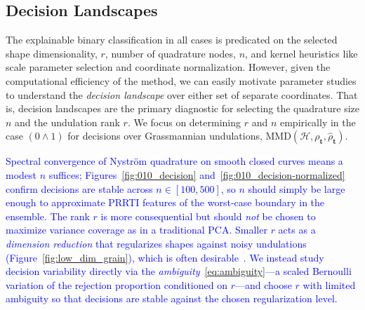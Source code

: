 \documentclass[pdflatex,iicol]{sn-jnl}%
\theoremstyle{thmstyleone}%
\theoremstyle{thmstyletwo}%
\theoremstyle{thmstylethree}%
\begin{document}
\subsection{Decision Landscapes}
The explainable binary classification in all cases is predicated on the selected shape dimensionality, $r$, number of quadrature nodes, $n$, and kernel heuristics like scale parameter selection and coordinate normalization. However, given the computational efficiency of the method, we can easily motivate parameter studies to understand the \textit{decision landscape} over either set of separate coordinates. That is, decision landscapes are the primary diagnostic for selecting the quadrature size $n$ and the undulation rank $r$. We focus on determining $r$ and $n$ empirically in the case $(0 \wedge 1)$ for decisions over Grassmannian undulations, $\text{MMD}(\mathcal{H},\rho_{\boldsymbol{t}},\widehat{\rho}_{\boldsymbol{t}}) $.

\textcolor{blue}{Spectral convergence of Nystr\"om quadrature on smooth closed curves means a modest $n$ suffices; Figures~\ref{fig:010_decision} and~\ref{fig:010_decision-normalized} confirm decisions are stable across $n\in[100,500]$, so $n$ should simply be large enough to approximate PRRTI features of the worst-case boundary in the ensemble. The rank $r$ is more consequential but should \emph{not} be chosen to maximize variance coverage as in a traditional PCA. Smaller $r$ acts as a \textit{dimension reduction} that regularizes shapes against noisy undulations (Figure~\ref{fig:low_dim_grain}), which is often desirable~\cite{doronina2025aerodynamic}. We instead study decision variability directly via the \emph{ambiguity}~\eqref{eq:ambiguity}---a scaled Bernoulli variation of the rejection proportion conditioned on $r$---and choose $r$ with limited ambiguity so that decisions are stable against the chosen regularization level.}
\end{document}
